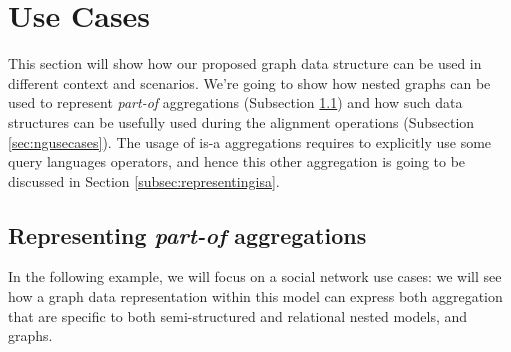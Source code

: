 \section{Use Cases}\label{sec:squatcases}
This section will show how our proposed graph data structure can be used in different context and scenarios. We're going to show how nested graphs can be used to represent \textit{part-of} aggregations (Subsection \ref{subsec:nested-partof}) and how such data structures can be usefully used during the alignment operations (Subsection \vref{sec:ngusecases}). The usage of is-a aggregations requires to explicitly use some query languages operators, and hence this other aggregation is going to be discussed in Section \vref{subsec:representingisa}.

\subsection{Representing \textit{part-of} aggregations}\label{subsec:nested-partof}
In the following example, we will focus on a social network use cases: we will see how a graph data representation within this model can express both aggregation that are specific to both semi-structured and relational nested models, and graphs.

